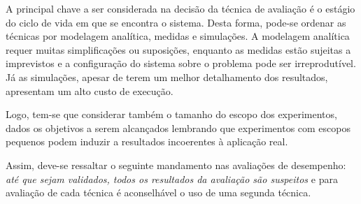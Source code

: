   
\begin{table}[h]
\caption{Critérios para seleção e técnicas de avaliação} \cite[p. 31]{Jain}
\label{my-label}
\centering
{}
\end{table}
  
    
    A principal chave a ser considerada na decisão da técnica de avaliação é o estágio do ciclo de vida em que se encontra o sistema. Desta forma, pode-se ordenar as técnicas por modelagem analítica, medidas e  simulações. A modelagem analítica requer muitas simplificações ou suposições, enquanto as medidas estão sujeitas a imprevistos e a configuração do sistema sobre o problema pode ser irreprodutível. Já as simulações, apesar de terem um melhor detalhamento dos resultados, apresentam um alto custo de execução.
    
    Logo, tem-se que considerar também o tamanho do escopo dos experimentos, dados os objetivos a serem alcançados lembrando que experimentos com escopos pequenos podem induzir a resultados incoerentes à aplicação real.
    
    Assim, deve-se ressaltar o seguinte mandamento nas avaliações de desempenho: \textit{até que sejam validados, todos os resultados da avaliação são suspeitos} \cite{Jain} e para avaliação de cada técnica é aconselhável o uso de uma segunda técnica.
    
